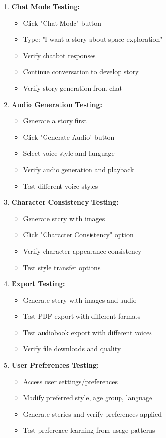 {\begin{enumerate}
    \item \textbf{Chat Mode Testing:}
    \begin{itemize}
        \item Click "Chat Mode" button
        \item Type: "I want a story about space exploration"
        \item Verify chatbot responses
        \item Continue conversation to develop story
        \item Verify story generation from chat
    \end{itemize}
    
    \item \textbf{Audio Generation Testing:}
    \begin{itemize}
        \item Generate a story first
        \item Click "Generate Audio" button
        \item Select voice style and language
        \item Verify audio generation and playback
        \item Test different voice styles
    \end{itemize}
    
    \item \textbf{Character Consistency Testing:}
    \begin{itemize}
        \item Generate story with images
        \item Click "Character Consistency" option
        \item Verify character appearance consistency
        \item Test style transfer options
    \end{itemize}
    
    
    \item \textbf{Export Testing:}
    \begin{itemize}
        \item Generate story with images and audio
        \item Test PDF export with different formats
        \item Test audiobook export with different voices
        \item Verify file downloads and quality
    \end{itemize}
    
    \item \textbf{User Preferences Testing:}
    \begin{itemize}
        \item Access user settings/preferences
        \item Modify preferred style, age group, language
        \item Generate stories and verify preferences applied
        \item Test preference learning from usage patterns
    \end{itemize}
    

\end{enumerate}}
